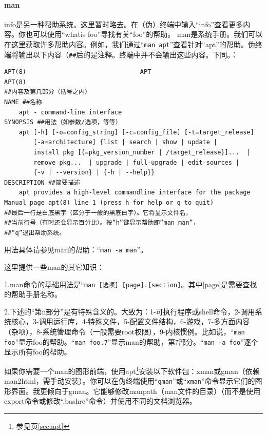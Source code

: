 \paragraph{man}info是另一种帮助系统。这里暂时略去。在（伪）终端中输入“info”查看更多内容。你也可以使用“whatis foo”寻找有关“foo”的帮助。
man是系统手册。我们可以在这里获取许多帮助内容。例如，我们通过“\verb|man apt|”查看针对“apt”的帮助。伪终端将输出以下内容（\verb|##|后的是注释。终端中并不会输出这些内容。下同。：
\begin{verbatim}
APT(8)                               APT                              APT(8)
##内容及第几部分（括号之内）
NAME ##名称
    apt - command-line interface
SYNOPSIS ##用法（如参数/选项，等等）
    apt [-h] [-o=config_string] [-c=config_file] [-t=target_release]
        [-a=architecture] {list | search | show | update |
        install pkg [{=pkg_version_number | /target_release}]...  |
        remove pkg...  | upgrade | full-upgrade | edit-sources |
        {-v | --version} | {-h | --help}}
DESCRIPTION ##简要描述
    apt provides a high-level commandline interface for the package
Manual page apt(8) line 1 (press h for help or q to quit)
##最后一行是白底黑字（区分于一般的黑底白字）。它将显示文件名，
##当前行号（有时还会显示百分比）。按“h”键显示帮助即“man man”，
##“q”退出帮助系统。
\end{verbatim}
用法具体请参见man的帮助：“\verb|man -a man|”。\par 这里提供一些man的其它知识：\par 1.man命令的基础用法是“\verb|man [选项] [page].[section]|。其中[page]是需要查找的帮助手册名称。\par 2.下述的“第n部分”是有特殊含义的。大致为：1-可执行程序或shell命令，2-调用系统核心，3-调用运行库，4-特殊文件，5-配置文件结构，6-游戏，7-多方面内容（杂项），8-系统管理命令（一般需要root权限），9-内核惯例。比如说，“\verb|man foo|”显示foo的帮助。“\verb|man foo.7|”显示man的帮助，第7部分。“\verb|man -a foo|”逐个显示所有foo的帮助。\par
如果你需要一个man的图形前端，使用apt\footnote{参见\pageref{sec:apt}页\ref{sec:apt}}安装以下软件包：xman或gman（依赖man2html，需手动安装）。你可以在伪终端使用“\verb|gman|”或“\verb|xman|”命令显示它们的图形界面。我更倾向于gman。它能够修改manpath（man文件的目录）（而不是使用export命令或修改“.bashrc”命令）并使用不同的文档浏览器。\par
